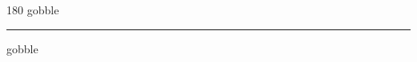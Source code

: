 
\begin{frame}
\begin{center}
\begin{turn}{180}
{\fontsize{2.5cm}{1em}\selectfont gobble}
\end{turn}
\vspace{1em}\par  
\hrule
\vspace{1em}\par  
{\fontsize{2.5cm}{1em}\selectfont gobble}
\end{center}
\end{frame}
